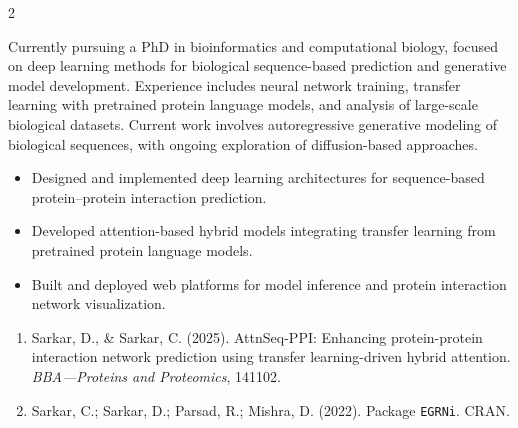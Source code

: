 \documentclass[10pt, a4paper, ragged2e, withhyper]{altacv}
\begin{document}


\makecvheader


\begin{paracol}{2}



Currently pursuing a PhD in bioinformatics and computational biology, focused on deep learning methods for biological sequence-based prediction and generative model development. Experience includes neural network training, transfer learning with pretrained protein language models, and analysis of large-scale biological datasets. Current work involves autoregressive generative modeling of biological sequences, with ongoing exploration of diffusion-based approaches.

\medskip


\begin{itemize}
  \item Designed and implemented deep learning architectures for sequence-based protein--protein interaction prediction.
  \item Developed attention-based hybrid models integrating transfer learning from pretrained protein language models.
  \item Built and deployed web platforms for model inference and protein interaction network visualization.
\end{itemize}


\begin{enumerate}
  \item Sarkar, D., \& Sarkar, C. (2025). AttnSeq-PPI: Enhancing protein-protein interaction network prediction using transfer learning-driven hybrid attention. \textit{BBA---Proteins and Proteomics}, 141102.
  \item Sarkar, C.; Sarkar, D.; Parsad, R.; Mishra, D. (2022). Package \texttt{EGRNi}. CRAN.
\end{enumerate}


\end{paracol}
\end{document}
